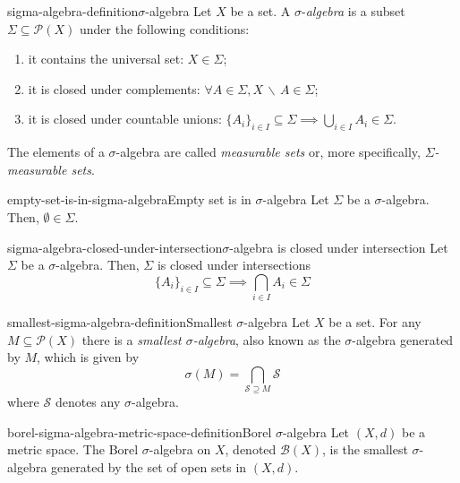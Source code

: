 \documentclass[preview]{standalone}
\begin{document}
\genpage

\begin{snippetdefinition}{sigma-algebra-definition}{\(\sigma\)-algebra}
    Let \(X\) be a set.
    A \(\sigma\)-\textit{algebra} is a subset \(\Sigma \subseteq \mathcal{P}(X)\)
    under the following conditions:
    \begin{enumerate}
        \item it contains the universal set: \(X \in \Sigma\);
        \item it is closed under complements: \(\forall A \in \Sigma, X \,\backslash\, A \in \Sigma\);
        \item it is closed under countable unions: \({\{A_i\}}_{i \in I} \subseteq \Sigma \implies \bigcup_{i \in I} A_i \in \Sigma \).
    \end{enumerate}
    The elements of a \(\sigma\)-algebra are called \textit{measurable sets}
    or, more specifically, \textit{\(\Sigma\)-measurable sets}.
\end{snippetdefinition}

\begin{snippetcorollary}{empty-set-is-in-sigma-algebra}{Empty set is in \(\sigma\)-algebra}
    Let \(\Sigma\) be a \(\sigma\)-algebra. Then, \(\emptyset \in \Sigma\).
\end{snippetcorollary}

\begin{snippetcorollary}{sigma-algebra-closed-under-intersection}{\(\sigma\)-algebra is closed under intersection}
    Let \(\Sigma\) be a \(\sigma\)-algebra. Then, \(\Sigma\) is closed under intersections
    \[
        {\{A_i\}}_{i \in I} \subseteq \Sigma \implies \bigcap_{i \in I} A_i \in \Sigma
    \]
\end{snippetcorollary}

\begin{snippetdefinition}{smallest-sigma-algebra-definition}{Smallest \(\sigma\)-algebra}
    Let \(X\) be a set. For any \(M \subseteq \mathcal{P}(X)\)
    there is a \textit{smallest \(\sigma\)-algebra}, also known as the
    \(\sigma\)-algebra generated by \(M\), which is given by
    \[ \sigma(M) = \bigcap_{\mathcal{S} \supseteq M} \mathcal{S} \]
    where \(\mathcal{S}\) denotes any \(\sigma\)-algebra.
\end{snippetdefinition}

\begin{snippetdefinition}{borel-sigma-algebra-metric-space-definition}{Borel \(\sigma\)-algebra}
    Let \((X, d)\) be a metric space.
    The Borel \(\sigma\)-algebra on \(X\), denoted \(\mathcal{B}(X)\),
    is the smallest \(\sigma\)-algebra generated by the set of open sets in \((X, d)\).
\end{snippetdefinition}

\end{document}
